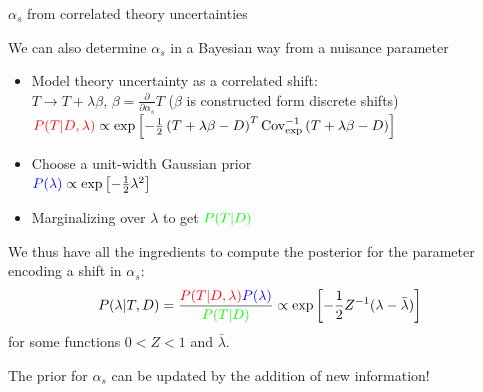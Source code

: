 \documentclass[8pt,t]{beamer}
\begin{document}
\begin{frame}{$\alpha_s$ from correlated theory uncertainties}


  We can also determine $\alpha_s$ in a Bayesian way from a nuisance parameter

  \begin{itemize}
    \item Model theory uncertainty as a correlated shift: \\
    $T \rightarrow T + \lambda \beta $, \quad $\beta=\frac{\partial}{\partial \alpha_s}T$ ($\beta$ is constructed form discrete shifts)\\
    ${\color{red}P(T|D,\lambda) }\propto \exp\left[-\frac{1}{2}\left(T+\lambda\beta-D\right)^T\mathrm{Cov}_\mathrm{exp}^{-1}\left(T+\lambda\beta-D\right)\right]$

    \item Choose a unit-width Gaussian prior\\
    ${\color{blue} P(\lambda)} \propto \exp\left[-\frac{1}{2}\lambda^2\right]$

    \item Marginalizing over $\lambda$ to get  ${\color{green} P(T|D)}$ \\

  \end{itemize}

  We thus have all the ingredients to compute the posterior for the parameter encoding a shift in $\alpha_s$: \\
  $$P(\lambda|T,D) = \frac{{\color{red}P(T|D,\lambda) }{\color{blue} P(\lambda)}}{{\color{green} P(T|D)}} \propto \exp\left[-\frac{1}{2}Z^{-1}(\lambda - \bar{\lambda})\right]$$
  for some functions $0<Z<1$ and $\bar{\lambda}$.

  \vspace{1em}
  \begin{center}
    The prior for $\alpha_s$ can be updated by the addition of new information!
  \end{center}



\end{frame}
\end{document}
